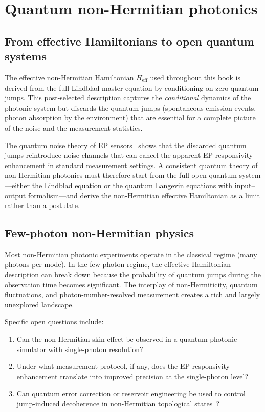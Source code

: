 \section{Quantum non-Hermitian photonics}
\label{sec:quantum-nh}

\subsection{From effective Hamiltonians to open quantum systems}
\label{ssec:quantum-effective}

The effective non-Hermitian Hamiltonian $H_{\mathrm{eff}}$ used
throughout this book is derived from the full Lindblad master equation
by conditioning on zero quantum jumps. This post-selected description
captures the \emph{conditional} dynamics of the photonic system but
discards the quantum jumps (spontaneous emission events, photon
absorption by the environment) that are essential for a complete picture
of the noise and the measurement statistics.

The quantum noise theory of EP sensors~\cite{zhang2018quantum} shows
that the discarded quantum jumps reintroduce noise channels that can
cancel the apparent EP responsivity enhancement in standard measurement
settings. A consistent quantum theory of non-Hermitian photonics must
therefore start from the full open quantum system---either the Lindblad
equation or the quantum Langevin equations with input--output
formalism---and derive the non-Hermitian effective Hamiltonian as a
limit rather than a postulate.

\subsection{Few-photon non-Hermitian physics}
\label{ssec:few-photon}

Most non-Hermitian photonic experiments operate in the classical regime
(many photons per mode). In the few-photon regime, the effective
Hamiltonian description can break down because the probability of
quantum jumps during the observation time becomes significant. The
interplay of non-Hermiticity, quantum fluctuations, and
photon-number-resolved measurement creates a rich and largely unexplored
landscape.

Specific open questions include:
\begin{enumerate}
 \item Can the non-Hermitian skin effect be observed in a quantum
 photonic simulator with single-photon resolution?
 \item Under what measurement protocol, if any, does the EP
 responsivity enhancement translate into improved precision at the
 single-photon level?
 \item Can quantum error correction or reservoir engineering be used to
 control jump-induced decoherence in non-Hermitian topological
 states~\cite{gao2024quantum,al2024topological,acn2018quantum}?
\end{enumerate}

